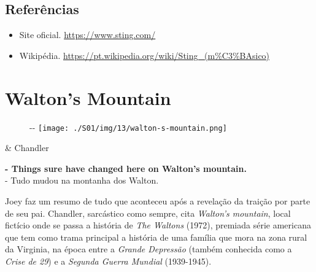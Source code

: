 \hypertarget{referuxeancias-3}{%
\subsection{Referências}\label{referuxeancias-3}}

\begin{itemize}
\tightlist
\item
  \sloppy Site oficial. \url{https://www.sting.com/}
\item
  \sloppy Wikipédia. \url{https://pt.wikipedia.org/wiki/Sting_(m%C3%BAsico)}
\end{itemize}

\hypertarget{waltons-mountain}{%
\section{Walton's Mountain}\label{waltons-mountain}}

\begin{figure}[!ht]
  \begin{adjustwidth}{-\oddsidemargin-1in}{-\rightmargin}
    \centering
    \texttt{[image: ./S01/img/13/walton-s-mountain.png]}
  \end{adjustwidth}
\end{figure}

\begin{tcolorbox}[enhanced,center upper,
    drop fuzzy shadow southeast, boxrule=0.3pt,
    lower separated=false, breakable,
    colframe=black!30!dialogoBorder,colback=white]
\begin{minipage}[c]{0.16\linewidth}
   & \centering \scriptsize{Chandler}
\end{minipage}
\hfill
\begin{minipage}[c]{0.8\linewidth}
  \textbf{- Things sure have changed here on Walton's mountain.}\\
  - Tudo mudou na montanha dos Walton.
\end{minipage}
\end{tcolorbox}

Joey faz um resumo de tudo que aconteceu após a revelação da traição por
parte de seu pai. Chandler, sarcástico como sempre, cita \emph{Walton's
mountain}, local fictício onde se passa a história de \emph{The Waltons}
(1972), premiada série americana que tem como trama principal a história
de uma família que mora na zona rural da Virginia, na época entre a
\emph{Grande Depressão} (também conhecida como a \emph{Crise de 29}) e a
\emph{Segunda Guerra Mundial} (1939-1945).

